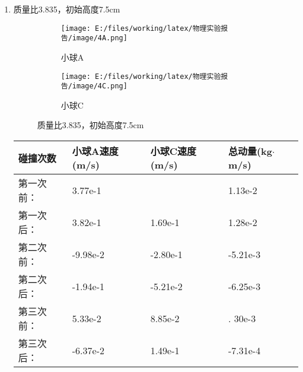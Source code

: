 \documentclass[UTF8]{article}
\begin{document}
\begin{enumerate}
\begin{enumerate}[left=2em, label=\arabic*)]
                 
                        \item 质量比3.835，初始高度7.5cm
                            \begin{figure}[H]
                                \centering
                                \begin{subfigure}{0.45\textwidth}
                                    \centering
                                    \texttt{[image: E:/files/working/latex/物理实验报告/image/4A.png]}
                                    \caption{小球A}
                                    \label{fig:4A}
                                \end{subfigure}
                                \hfill
                                \begin{subfigure}{0.45\textwidth}
                                    \centering
                                    \texttt{[image: E:/files/working/latex/物理实验报告/image/4C.png]}
                                    \caption{小球C}
                                    \label{fig:4C}
                                \end{subfigure}
                                \caption{质量比3.835，初始高度7.5cm}
                                \label{fig:3.835-7.5}
                            \end{figure}
                            \vfill
                            \begin{table}[H]
                                \centering
                                \begin{tabularx}{\textwidth}{
                                    || >{\centering\arraybackslash}X
                                    | >{\centering\arraybackslash}X
                                    | >{\centering\arraybackslash}X
                                    | >{\centering\arraybackslash}X
                                    ||
                                }
                                    \hline
                                    碰撞次数 & 小球A速度(m/s) & 小球C速度(m/s) & 总动量(kg$\cdot$m/s)\\ \hline
                                    第一次前： & 3.77e-1 & 0 & 1.13e-2 \\ \hline
                                    第一次后： & 3.82e-1 & 1.69e-1 & 1.28e-2 \\ \hline
                                    第二次前： & -9.98e-2 & -2.80e-1 & -5.21e-3\\ \hline
                                    第二次后： & -1.94e-1 & -5.21e-2 & -6.25e-3 \\ \hline
                                    第三次前： & 5.33e-2 & 8.85e-2 & 2. 30e-3 \\ \hline
                                    第三次后： & -6.37e-2 & 1.49e-1 & -7.31e-4\\ \hline
                                    

\end{tabularx}
\end{table}
\end{enumerate}
\end{enumerate}
\end{document}
